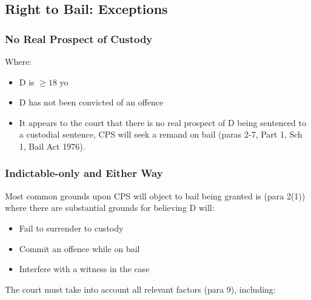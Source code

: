 \documentclass[
]{article}
\providecommand{\tightlist}{%
  \setlength{\itemsep}{0pt}\setlength{\parskip}{0pt}}
\begin{document}
\hypertarget{right-to-bail-exceptions}{%
\subsection{Right to Bail: Exceptions}\label{right-to-bail-exceptions}}

\hypertarget{no-real-prospect-of-custody}{%
\subsubsection{No Real Prospect of
Custody}\label{no-real-prospect-of-custody}}

Where:

\begin{itemize}
\tightlist
\item
  D is \(\geq 18\) yo
\item
  D has not been convicted of an offence
\item
  It appears to the court that there is no real prospect of D being
  sentenced to a custodial sentence, CPS will seek a remand on bail
  (paras 2-7, Part 1, Sch 1, Bail Act 1976).
\end{itemize}

\hypertarget{indictable-only-and-either-way}{%
\subsubsection{Indictable-only and Either
Way}\label{indictable-only-and-either-way}}

Most common grounds upon CPS will object to bail being granted is (para
2(1)) where there are substantial grounds for believing D will:

\begin{itemize}
\tightlist
\item
  Fail to surrender to custody
\item
  Commit an offence while on bail
\item
  Interfere with a witness in the case
\end{itemize}

The court must take into account all relevant factors (para 9),
including:
\end{document}
